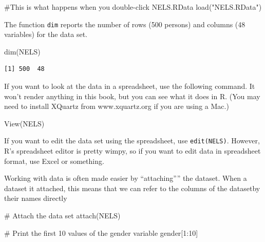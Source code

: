 \documentclass[
  letterpaper,
  DIV=11,
  numbers=noendperiod]{scrreprt}
\newenvironment{Shaded}{\begin{snugshade}}{\end{snugshade}}
\newcommand{\CommentTok}[1]{\textcolor[rgb]{0.37,0.37,0.37}{#1}}
\newcommand{\DecValTok}[1]{\textcolor[rgb]{0.68,0.00,0.00}{#1}}
\newcommand{\FunctionTok}[1]{\textcolor[rgb]{0.28,0.35,0.67}{#1}}
\newcommand{\NormalTok}[1]{\textcolor[rgb]{0.00,0.23,0.31}{#1}}
\newcommand{\SpecialCharTok}[1]{\textcolor[rgb]{0.37,0.37,0.37}{#1}}
\newcommand{\StringTok}[1]{\textcolor[rgb]{0.13,0.47,0.30}{#1}}
\begin{document}
\begin{Shaded}
\begin{Highlighting}[]
\CommentTok{\#This is what happens when you double{-}click NELS.RData}
\FunctionTok{load}\NormalTok{(}\StringTok{"NELS.RData"}\NormalTok{)}
\end{Highlighting}
\end{Shaded}

The function \texttt{dim} reports the number of rows (500 persons) and
columns (48 variables) for the data set.

\begin{Shaded}
\begin{Highlighting}[]
\FunctionTok{dim}\NormalTok{(NELS)}
\end{Highlighting}
\end{Shaded}

\begin{verbatim}
[1] 500  48
\end{verbatim}

If you want to look at the data in a spreadsheet, use the following
command. It won't render anything in this book, but you can see what it
does in R. (You may need to install XQuartz from www.xquartz.org if you
are using a Mac.)

\begin{Shaded}
\begin{Highlighting}[]
\FunctionTok{View}\NormalTok{(NELS)}
\end{Highlighting}
\end{Shaded}

If you want to edit the data set using the spreadsheet, use
\texttt{edit(NELS)}. However, R's spreadsheet editor is pretty wimpy, so
if you want to edit data in spreadsheet format, use Excel or something.

Working with data is often made easier by ``attaching'''' the dataset.
When a dataset it attached, this means that we can refer to the columns
of the datasetby their names directly

\begin{Shaded}
\begin{Highlighting}[]
\CommentTok{\# Attach the data set}
\FunctionTok{attach}\NormalTok{(NELS)}

\CommentTok{\# Print the first 10 values of the gender variable}
\NormalTok{gender[}\DecValTok{1}\SpecialCharTok{:}\DecValTok{10}\NormalTok{]}
\end{Highlighting}
\end{Shaded}
\end{document}
